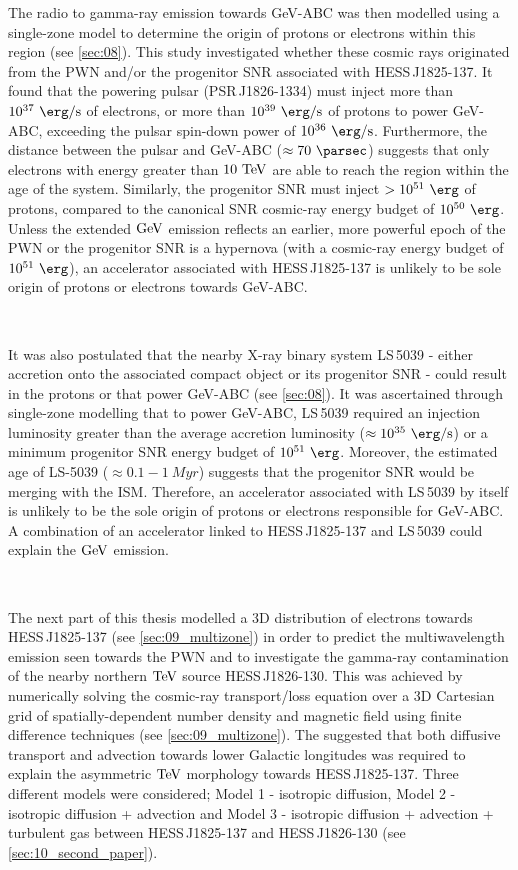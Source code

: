 The radio to gamma-ray emission towards \mbox{GeV-ABC} was then modelled using a single-zone model to determine the origin of protons or electrons within this region (see \autoref{sec:08}). This study investigated whether these cosmic rays originated from the PWN and/or the progenitor SNR associated with \mbox{HESS\,J1825-137}. It found that the powering pulsar (\mbox{PSR\,J1826-1334}) must inject more than {$10^{37}~\ergspersec$} of electrons, or more than $10^{39}~\ergspersec$ of protons to power \mbox{GeV-ABC}, exceeding the pulsar spin-down power of $10^{36}~\ergspersec$. Furthermore, the distance between the pulsar and GeV-ABC ($\approx 70~\pc$) suggests that only electrons with energy greater than $10~\TeV$ are able to reach the region within the age of the system. Similarly, the progenitor SNR must inject $>10^{51}~\ergs$ of protons, compared to the canonical SNR cosmic-ray energy budget of $10^{50}~\ergs$. Unless the extended $\si{\giga\electronvolt}$ emission reflects an earlier, more powerful epoch of the PWN or the progenitor SNR is a hypernova (with a cosmic-ray energy budget of $10^{51}~\ergs$), an accelerator associated with \mbox{HESS\,J1825-137} is unlikely to be sole origin of protons or electrons towards \mbox{GeV-ABC}.
\par~\par 
It was also postulated that the nearby X-ray binary system \mbox{LS\,5039} - either accretion onto the associated compact object or its progenitor SNR - could result in the protons or that power \mbox{GeV-ABC} (see \autoref{sec:08}). It was ascertained through single-zone modelling that to power GeV-ABC, \mbox{LS\,5039} required an injection luminosity greater than the average accretion luminosity ($\approx 10^{35}~\ergspersec$) or a minimum progenitor SNR energy budget of $10^{51}~\ergs$. Moreover, the estimated age of \mbox{LS-5039} ($\approx 0.1-1~\si{Myr}$) suggests that the progenitor SNR would be merging with the ISM. Therefore, an accelerator associated with \mbox{LS\,5039} by itself is unlikely to be the sole origin of protons or electrons responsible for GeV-ABC. A combination of an accelerator linked to \mbox{HESS\,J1825-137} and \mbox{LS\,5039} could explain the $\si{\giga\electronvolt}$ emission.
\par~\par
The next part of this thesis modelled a 3D distribution of electrons towards \linebreak \mbox{HESS\,J1825-137} (see \autoref{sec:09_multizone}) in order to predict the multiwavelength emission seen towards the PWN and to investigate the gamma-ray contamination of the nearby northern $\TeV$ source \mbox{HESS\,J1826-130}. This was achieved by numerically solving the cosmic-ray transport/loss equation over a 3D Cartesian grid of spatially-dependent number density and magnetic field using finite difference techniques (see \autoref{sec:09_multizone}). The \cite{2019A&A...621A.116H} suggested that both diffusive transport and advection towards lower Galactic longitudes was required to explain the asymmetric $\TeV$ morphology towards \mbox{HESS\,J1825-137}. Three different models were considered; Model 1 - isotropic diffusion, Model 2 - isotropic diffusion + advection and Model 3 - isotropic diffusion + advection + turbulent gas between \mbox{HESS\,J1825-137} and \mbox{HESS\,J1826-130} (see \autoref{sec:10_second_paper}).
